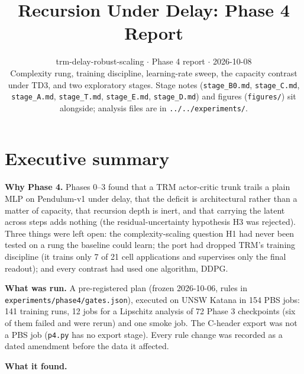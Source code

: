 \documentclass[11pt]{article}
\title{Recursion Under Delay: Phase 4 Report}
\author{}
\date{trm-delay-robust-scaling $\cdot$ Phase 4 report $\cdot$ 2026-10-08\\[2pt]Complexity rung, training discipline, learning-rate sweep, the capacity contrast under TD3, and two exploratory stages. Stage notes (\texttt{stage\_B0.md}, \texttt{stage\_C.md}, \texttt{stage\_A.md}, \texttt{stage\_T.md}, \texttt{stage\_E.md}, \texttt{stage\_D.md}) and figures (\texttt{figures/}) sit alongside; analysis files are in \texttt{.\allowbreak{}.\allowbreak{}/\allowbreak{}.\allowbreak{}.\allowbreak{}/\allowbreak{}experiments/\allowbreak{}}.}
\begin{document}
\maketitle
\tableofcontents
\clearpage



\section*{Executive summary}



\textbf{Why Phase 4.} Phases 0--3 found that a TRM actor-critic trunk trails a plain MLP on Pendulum-v1 under delay, that the deficit is architectural rather than a matter of capacity, that recursion depth is inert, and that carrying the latent across steps adds nothing (the residual-uncertainty hypothesis H3 was rejected). Three things were left open: the complexity-scaling question H1 had never been tested on a rung the baseline could learn; the port had dropped TRM's training discipline (it trains only 7 of 21 cell applications and supervises only the final readout); and every contrast had used one algorithm, DDPG.



\textbf{What was run.} A pre-registered plan (frozen 2026-10-06, rules in \texttt{experiments/\allowbreak{}phase4/\allowbreak{}gates.\allowbreak{}json}), executed on UNSW Katana in 154 PBS jobs: 141 training runs, 12 jobs for a Lipschitz analysis of 72 Phase 3 checkpoints (six of them failed and were rerun) and one smoke job. The C-header export was not a PBS job (\texttt{p4.py} has no export stage). Every rule change was recorded as a dated amendment before the data it affected.



\textbf{What it found.}
\end{document}
